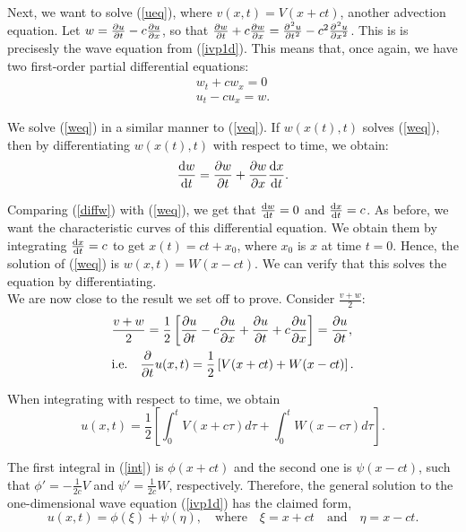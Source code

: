 \documentclass[a4paper, 12pt]{article}
\numberwithin{equation}{section}
\begin{document}
Next, we want to solve (\ref{ueq}), where $v(x,t)=V(x+ct)$, another advection
equation. Let $w=\diffp[1]{u}{t}-c\diffp{u}{x}$, so that
$\diffp[1]{w}{t}+c\diffp{w}{x}=\diffp[2]{u}{t}-c^2\diffp[2]{u}{x}$. This is is
precisesly the wave equation from (\ref{ivp1d}). This means that, once again, we
have two first-order partial differential equations:
\begin{align}
    \label{weq}
    w_t+cw_x=0\\
    \label{ueqw}
    u_t-cu_x=w.
\end{align}

We solve (\ref{weq}) in a similar manner to (\ref{veq}). If $w(x(t), t)$ solves
(\ref{weq}), then by differentiating $w(x(t),t)$ with respect to time, we obtain:
\begin{equation} \label{diffw}
    \diff{w}{t}=\diffp[1]{w}{t}+\diffp[1]{w}{x}\diff{x}{t}. 
\end{equation}

Comparing (\ref{diffw}) with (\ref{weq}), we get that $\diff{w}{t}=0$ and
$\diff{x}{t}=c$. As before, we want the characteristic curves of this
differential equation. We obtain them by integrating $\diff{x}{t}=c$ to get
$x(t)=ct+x_0$, where $x_0$ is $x$ at time $t=0$. Hence, the solution of
(\ref{weq}) is $w(x,t)=W(x-ct)$. We can verify that this solves the equation by
differentiating. \\

We are now close to the result we set off to prove. Consider $\frac{v+w}{2}$:
\begin{equation*}
    \begin{aligned}
    &\frac{v+w}{2}=\frac{1}{2}\left[\diffp[1]{u}{t}-c\diffp[1]{u}{x}+\diffp[1]{u}{t}+c\diffp[1]{u}{x}\right]=\diffp[1]{u}{t},\\
    &\textrm{i.e.} \quad \diffp[1]{}{t}u(x, t)=\frac{1}{2}\left[V(x+ct)+W(x-ct)\right].
    \end{aligned}
\end{equation*}

When integrating with respect to time, we obtain
\begin{equation} \label{int}
    u(x,t)=\frac{1}{2}\left[\int_0^t{V(x+c\tau)d\tau}+\int_0^t{W(x-c\tau)d\tau}\right].
\end{equation}

The first integral in (\ref{int}) is $\phi(x+ct)$ and the second one is
$\psi(x-ct)$, such that $\phi'=-\frac{1}{2c}V$ and $\psi'=\frac{1}{2c}W$,
respectively. Therefore, the general solution to the one-dimensional wave
equation (\ref{ivp1d}) has the claimed form, 
\begin{equation} \label{gensol}
    u(x, t)=\phi(\xi)+\psi(\eta), \quad \textrm{where} \quad \xi=x+ct \quad \textrm{and} \quad \eta=x-ct.
\end{equation}
\end{document}
